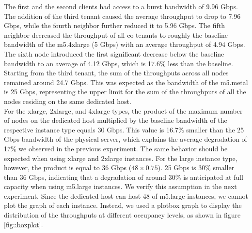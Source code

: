 \noindent
The first and the second clients had access to a burst 
bandwidth of 9.96 Gbps. The addition of the third tenant caused the average throughput to drop to 
7.96 Gbps, while the fourth neighbor further reduced it to 5.96 Gbps. 
The fifth neighbor decreased the throughput of all co-tenants to roughly 
the baseline bandwidth of the m5.4xlarge (5 Gbps) with an average throughput of 4.94 Gbps. 
The sixth node introduced the first significant decrease below the baseline bandwidth to an average 
of 4.12 Gbps, which is 17.6\% less than the baseline. 
Starting from the third tenant, the sum of the throughputs across all nodes remained around 24.7 Gbps.  
This was expected as the bandwidth of the m5.metal is 25 Gbps, representing the upper limit for the 
sum of the throughputs of all the nodes residing on the same dedicated host. \\
For the xlarge, 2xlarge, and 4xlarge types, the product of the 
maximum number of nodes on the dedicated host multiplied by the baseline bandwidth of the respective
instance type equals 30 Gbps. This value is 16.7\% smaller than the 25 Gbps bandwidth 
of the physical server, which explains the average degradation of 17\% we observed in the previous 
experiment. The same behavior should be expected when using xlarge and 2xlarge instances. 
For the large instance type, however, the product is equal to 
36 Gbps (\begin{math} 48 \times 0.75\end{math}).
25 Gbps is 30\% smaller than 36 Gbps, indicating that a  
degradation of around 30\% is anticipated at full capacity when using m5.large instances. 
We verify this assumption in the next experiment. Since the dedicated host can host 48 of m5.large 
instances, we cannot plot the graph of each instance. Instead, we used a plotbox graph to display the 
distribution of the throughputs at different occupancy levels, as shown in figure \ref{fig::boxplot}.

